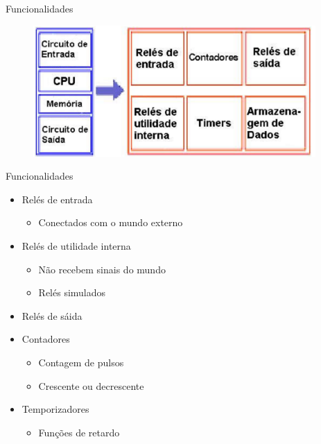 \documentclass[aspectratio=169,
				xcolor=table]{beamer}
\begin{document}
	\begin{frame}{Funcionalidades}
				\begin{figure}[hbtp]
				\centering
				\includegraphics[height=5cm, keepaspectratio]{../figs/cap04/funcionalidades.png}
				\end{figure}
	\end{frame}
	
	\begin{frame}[allowframebreaks]{Funcionalidades}
		
		\begin{itemize}
			\item Relés de entrada
			\begin{itemize}
				\item Conectados com o mundo externo
			\end{itemize}
			\vspace{1em}
			\item Relés de utilidade interna
			\begin{itemize}
				\item Não recebem sinais do mundo
				\item Relés simulados
			\end{itemize}
			\vspace{1em}
			\item Relés de sáida
			\framebreak
			\item Contadores
			\begin{itemize}
				\item Contagem de pulsos
				\item Crescente ou decrescente
			\end{itemize}
			\vspace{1em}
			\item Temporizadores
			\begin{itemize}
				\item Funções de retardo
			\end{itemize}
		\end{itemize}
	\end{frame}
\end{document}
